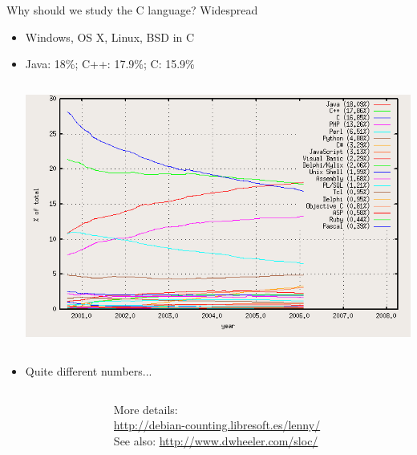 \begin{frame}{Why should we study the C language? Widespread}
    \begin{itemize}
    \item {}
      Windows, OS X, Linux, BSD  in C
    \item {}
      Java: 18\%; C++: 17.9\%;  C: 15.9\%
    \begin{columns}
      \begin{column}{.45\linewidth}
        
        \centerline{\includegraphics[width=\linewidth]{img/intro-language-sourceforge.png}%
        }
        
      \end{column}
    \end{columns}
\medskip
  \item {}
    Quite different numbers...
    \end{itemize}

    \begin{columns}  
      \begin{column}{.35\linewidth}
        \setcounter{b}{0}
      \end{column}
      \begin{column}{.5\linewidth}
        {\scriptsize More details:\\
        \url{http://debian-counting.libresoft.es/lenny/}\\
        See also: \url{http://www.dwheeler.com/sloc/}}


\end{column}
\end{columns}
\end{frame}
